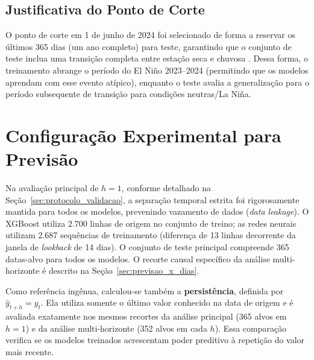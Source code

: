 \subsection{Justificativa do Ponto de Corte}

O ponto de corte em 1\textordmasculine{} de junho de 2024 foi selecionado de forma a reservar os últimos 365 dias (um ano completo) para teste, garantindo que o conjunto de teste inclua uma transição completa entre estação seca e chuvosa \cite{hyndman2018forecasting}. Dessa forma, o treinamento abrange o período do El Niño 2023--2024 (permitindo que os modelos aprendam com esse evento atípico), enquanto o teste avalia a generalização para o período subsequente de transição para condições neutras/La Niña.

\section{Configuração Experimental para Previsão}\label{sec:treinamento}

Na avaliação principal de $h=1$, conforme detalhado na Seção~\ref{sec:protocolo_validacao}, a separação temporal estrita foi rigorosamente mantida para todos os modelos, prevenindo vazamento de dados (\textit{data leakage}). O XGBoost utiliza 2.700 linhas de origem no conjunto de treino; as redes neurais utilizam 2.687 sequências de treinamento (diferença de 13 linhas decorrente da janela de \textit{lookback} de 14 dias). O conjunto de teste principal compreende 365 datas-alvo para todos os modelos. O recorte causal específico da análise multi-horizonte é descrito na Seção~\ref{sec:previsao_x_dias}.

Como referência ingênua, calculou-se também a \textbf{persistência}, definida por $\hat{y}_{t+h}=y_t$. Ela utiliza somente o último valor conhecido na data de origem e é avaliada exatamente nos mesmos recortes da análise principal (365 alvos em $h=1$) e da análise multi-horizonte (352 alvos em cada $h$). Essa comparação verifica se os modelos treinados acrescentam poder preditivo à repetição do valor mais recente.

